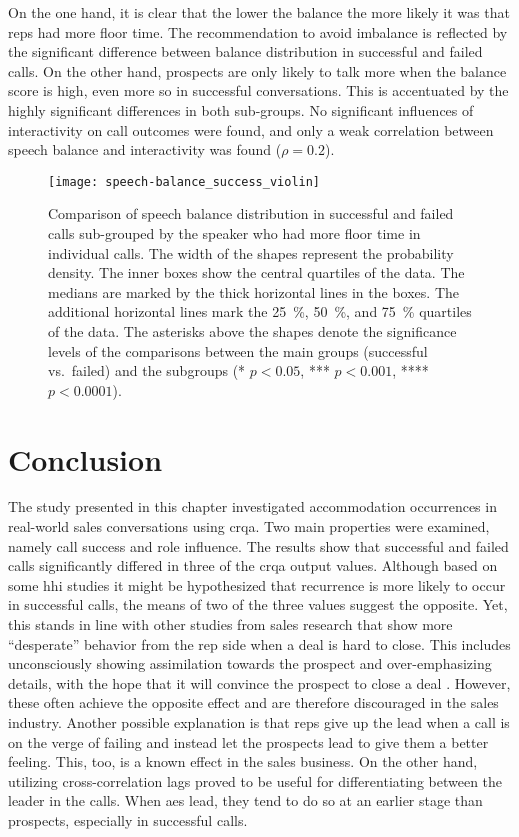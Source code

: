 On the one hand, it is clear that the lower the balance the more likely it was that reps had more floor time.
The recommendation to avoid imbalance is reflected by the significant difference between balance distribution in successful and failed calls.
On the other hand, prospects are only likely to talk more when the balance score is high, even more so in successful conversations.
This is accentuated by the highly significant differences in both sub-groups.
No significant influences of interactivity on call outcomes were found, and only a weak correlation between speech balance and interactivity was found ($\rho = 0.2$).
%
\begin{figure}
	\centering
	\texttt{[image: speech-balance\_success\_violin]}
	\caption[Distribution of speech balance in successful and failed calls]
		{Comparison of speech balance distribution in successful and failed calls sub-grouped by the speaker who had more floor time in individual calls.
		The width of the shapes represent the probability density.
		The inner boxes show the central quartiles of the data.
		The medians are marked by the thick horizontal lines in the boxes.
		The additional horizontal lines mark the \SI{25}{\percent}, \SI{50}{\percent}, and \SI{75}{\percent} quartiles of the data.
		The asterisks above the shapes denote the significance levels of the comparisons between the main groups (successful vs.\ failed) and the subgroups (* $p < 0.05$, *** $p < 0.001$, **** $p < 0.0001$).}
	\label{fig:speech-balance_success_violin}
\end{figure}

\section{Conclusion}
\label{sec:conclusion_hhi}

The study presented in this chapter investigated accommodation occurrences in real-world sales conversations using \acf{crqa}.
Two main properties were examined, namely call success and role influence.
The results show that successful and failed calls significantly differed in three of the \ac{crqa} output values.
Although based on some \ac{hhi} studies it might be hypothesized that recurrence is more likely to occur in successful calls, the means of two of the three values suggest the opposite.
Yet, this stands in line with other studies from sales research that show more \enquote{desperate} behavior from the rep side when a deal is hard to close.
This includes unconsciously showing assimilation towards the prospect and over-emphasizing details, with the hope that it will convince the prospect to close a deal \citep{Orlob2018roi}.
However, these often achieve the opposite effect and are therefore discouraged in the sales industry.
Another possible explanation is that reps give up the lead when a call is on the verge of failing and instead let the prospects lead to give them a better feeling.
This, too, is a known effect in the sales business.
On the other hand, utilizing cross-correlation lags proved to be useful for differentiating between the leader in the calls.
When \acfp{ae} lead, they tend to do so at an earlier stage than prospects, especially in successful calls.

